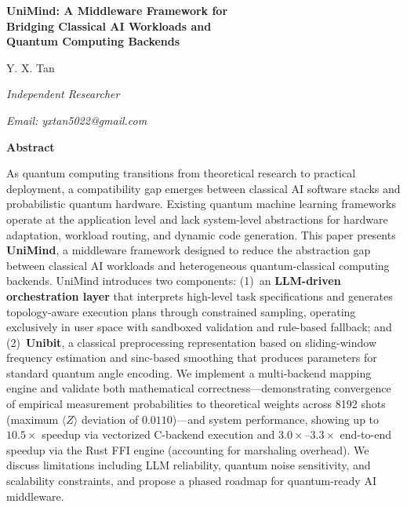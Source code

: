 ﻿\documentclass[12pt,a4paper]{article}
\begin{document}
\begin{titlepage}
\centering
\vspace*{2cm}

{\LARGE\bfseries UniMind: A Middleware Framework for\\[6pt]
Bridging Classical AI Workloads and\\[6pt]
Quantum Computing Backends\par}

\vspace{1.5cm}

{\Large Y. X. Tan\par}
\vspace{0.3cm}
{\normalsize\itshape Independent Researcher\par}
{\normalsize\itshape Email: yxtan5022@gmail.com\par}

\vspace{2cm}

{\large\bfseries Abstract\par}
\vspace{0.5cm}

\begin{minipage}{0.92\textwidth}
\small
As quantum computing transitions from theoretical research to practical deployment, a compatibility gap emerges between classical AI software stacks and probabilistic quantum hardware. Existing quantum machine learning frameworks operate at the application level and lack system-level abstractions for hardware adaptation, workload routing, and dynamic code generation. This paper presents \textbf{UniMind}, a middleware framework designed to reduce the abstraction gap between classical AI workloads and heterogeneous quantum-classical computing backends. UniMind introduces two components: (1)~an \textbf{LLM-driven orchestration layer} that interprets high-level task specifications and generates topology-aware execution plans through constrained sampling, operating exclusively in user space with sandboxed validation and rule-based fallback; and (2)~\textbf{Unibit}, a classical preprocessing representation based on sliding-window frequency estimation and sinc-based smoothing that produces parameters for standard quantum angle encoding. We implement a multi-backend mapping engine and validate both mathematical correctness---demonstrating convergence of empirical measurement probabilities to theoretical weights across 8192 shots (maximum $\langle Z \rangle$ deviation of $0.0110$)---and system performance, showing up to $10.5\times$ speedup via vectorized C-backend execution and $3.0\times$--$3.3\times$ end-to-end speedup via the Rust FFI engine (accounting for marshaling overhead). We discuss limitations including LLM reliability, quantum noise sensitivity, and scalability constraints, and propose a phased roadmap for quantum-ready AI middleware.
\end{minipage}


\end{titlepage}
\end{document}
